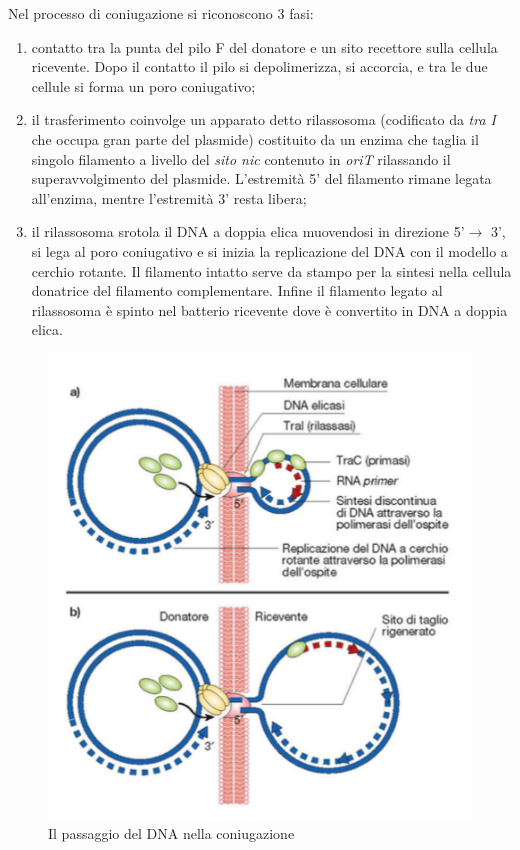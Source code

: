 \documentclass[11pt]{book}
\begin{document}
Nel processo di coniugazione si riconoscono 3 fasi: 
\begin{enumerate}
\item contatto tra la punta del pilo F del donatore e un sito recettore sulla cellula ricevente. Dopo il contatto il pilo si depolimerizza, si accorcia, e tra le due cellule si forma un poro coniugativo;
\item il trasferimento coinvolge un apparato detto rilassosoma (codificato da \emph{tra I} che occupa gran parte del plasmide) costituito da un enzima che taglia il singolo filamento a livello del \emph{sito nic} contenuto in \emph{oriT} rilassando il superavvolgimento del plasmide. L’estremità 5’ del filamento rimane legata all’enzima, mentre l’estremità 3’ resta libera;
\item il rilassosoma srotola il DNA a doppia elica muovendosi in direzione 5’$\to$ 3’, si lega al poro coniugativo e si inizia la replicazione del DNA con il modello a cerchio rotante. Il filamento intatto serve da stampo per la sintesi nella cellula donatrice del filamento complementare. Infine il filamento legato al rilassosoma è spinto nel batterio ricevente dove è convertito in DNA a doppia elica.
\end{enumerate}

\clearpage
\begin{figure}[htp]
\centering
\includegraphics[scale=0.5]{img/Passaggio plasmide nella coniugazione.png}
\caption{Il passaggio del DNA nella coniugazione}
\label{}
\end{figure}
\end{document}
